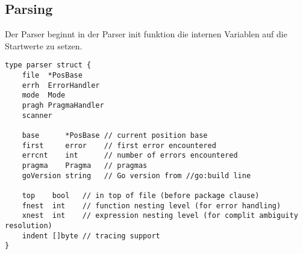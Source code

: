 \subsection{Parsing}
Der Parser beginnt in der Parser init funktion die internen Variablen auf die Startwerte zu setzen.
\begin{lstlisting}
type parser struct {
	file  *PosBase
	errh  ErrorHandler
	mode  Mode
	pragh PragmaHandler
	scanner

	base      *PosBase // current position base
	first     error    // first error encountered
	errcnt    int      // number of errors encountered
	pragma    Pragma   // pragmas
	goVersion string   // Go version from //go:build line

	top    bool   // in top of file (before package clause)
	fnest  int    // function nesting level (for error handling)
	xnest  int    // expression nesting level (for complit ambiguity resolution)
	indent []byte // tracing support
}
\end{lstlisting}

